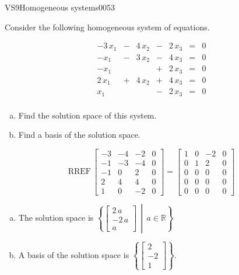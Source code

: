 \newpage




\begin{exercise}{VS9}{Homogeneous systems}{0053} 
\begin{exerciseStatement} 

Consider the following homogeneous system of equations.

 \[\begin{matrix}
 -3 \, x_{1} &  -  & 4 \, x_{2} &  -  & 2 \, x_{3} & = & 0 \\
 -x_{1} &  -  & 3 \, x_{2} &  -  & 4 \, x_{3} & = & 0 \\
 -x_{1} &  &  &  +  & 2 \, x_{3} & = & 0 \\
 2 \, x_{1} &  +  & 4 \, x_{2} &  +  & 4 \, x_{3} & = & 0 \\
 x_{1} &  &  &  -  & 2 \, x_{3} & = & 0 \\
 \end{matrix}\] 

\begin{enumerate}[(a)]
\item  Find the solution space of this system.
\item  Find a basis of the solution space.
\end{enumerate}

     \end{exerciseStatement}
 \begin{exerciseAnswer} 

\[\mathrm{RREF}\,\left[\begin{array}{ccc|c}
-3 & -4 & -2 & 0 \\
-1 & -3 & -4 & 0 \\
-1 & 0 & 2 & 0 \\
2 & 4 & 4 & 0 \\
1 & 0 & -2 & 0
\end{array}\right]=\left[\begin{array}{ccc|c}
1 & 0 & -2 & 0 \\
0 & 1 & 2 & 0 \\
0 & 0 & 0 & 0 \\
0 & 0 & 0 & 0 \\
0 & 0 & 0 & 0
\end{array}\right]\]

 

\begin{enumerate}[(a)]
\item The solution space is \( \left\{ \left[\begin{array}{c}
2 \, a \\
-2 \, a \\
a
\end{array}\right] \,\middle|\, a \in\mathbb R \right\} \) 
\item A basis of the solution space is \(\left\{ \left[\begin{array}{c}
2 \\
-2 \\
1
\end{array}\right] \right\}\).
\end{enumerate}

     \end{exerciseAnswer}
 \end{exercise}



